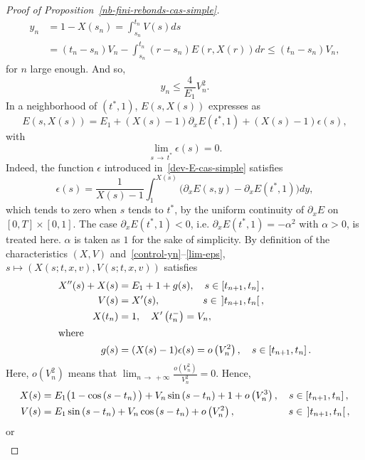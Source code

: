 \documentclass[10pt]{amsart}
\theoremstyle{definition}\newtheorem{defi}[theo]{Definition}\newtheorem{rema}[theo]{Remark}\newtheorem{exam}[theo]{Example}\newtheorem{exem}[theo]{Example}\newtheorem{nota}[theo]{Notation}
\begin{document}
\begin{proof}[{Proof of Proposition~\ref{nb-fini-rebonds-cas-simple}}]
\begin{align*}
y_n &= 1-X\left(s_n\right)= \int_{s_n}^{t_n} V(s)ds \\
&= \left(t_n - s_n\right) V_n - \int_{s_n}^{t_n} \left(r-s_n\right) E\left(r,X(r)\right)dr 
\leq \left(t_n-s_n\right)V_n,
\end{align*}
for $n$ large enough. And so,
\begin{equation}\label{control-yn}
y_n \leq \frac{4}{E_1}V_n^2.
\end{equation}
In a neighborhood of $(t^*,1)$, $E(s,X(s))$ expresses as
\begin{equation}\label{dev-E-cas-simple}
E(s,X(s)) = E_1 + (X(s)-1) \partial_x E(t^*,1)+(X(s)-1) \epsilon (s),
\end{equation}
with
\begin{equation}\label{lim-eps}
\lim_{s\,\to\,t^*} \epsilon (s) = 0.
\end{equation}
Indeed, the function $\epsilon $ introduced in~\eqref{dev-E-cas-simple} satisfies
\[
\epsilon (s)= \frac{1}{X(s)-1} \int_1^{X(s)} \big(\partial_x E(s,y) - \partial_x E(t^*,1)\big)dy,
\]
which tends to zero when $s$ tends to $t^*$, by the uniform continuity of $\partial_x E$ on\linebreak $[0,T] \times [0,1]$. The case $\partial_x E(t^*,1)<0$, i.e. $\partial_x E(t^*,1)= - \alpha^2 $ with $\alpha>0$, is treated here. $\alpha $ is taken as $1$ for the sake of simplicity. By definition of the characteristics $(X,V)$ and~\eqref{control-yn}--\eqref{lim-eps}, $s \mapsto (X(s;t,x,v), V(s;t,x,v))$ satisfies
\begin{align*}
X^{\prime \prime}(s) +X(s) &= E_1+ 1+g(s),\quad s\in \left[t_{n+1},t_n\right],\\
V(s) &= X^\prime (s),\mkern77mu s\in\,\left]t_{n+1},t_n\right[,\\
X(t_n) &= 1,\quad X^\prime \left(t_n^-\right)= V_n,
\\
\intertext{where}
g(s) &= (X(s)-1) \epsilon (s)= o\left(V_n^2\right),\quad s\in \left[t_{n+1},t_n\right].
\end{align*}
Here, $o(V_n^2)$ means that $\lim_{n\,\to\,+\infty}\tfrac{o(V_n^2)}{V_n^2}= 0$. Hence,
\begin{align*}
X(s) &= E_1\big(1-\cos \left(s-t_n\right)\big)+ V_n\sin \left(s-t_n\right)+ 1+o\left(V_n^3\right), \quad s\in \left[t_{n+1},t_n\right],\\
V(s) &= E_1\sin \left(s-t_n\right)+ V_n \cos \left(s-t_n\right)+o\left(V_n^2\right),\mkern96mu s\in\,\left]t_{n+1},t_n\right[,
\end{align*}
or
\begin{align}

\end{align}
\end{proof}
\end{document}
